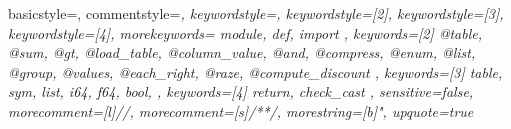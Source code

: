 
\usepackage{listings}
\usepackage{pifont}
\usepackage{ulem}


\newcommand{\hgb}[1]{{\color{Blue}{#1}}}
\newcommand{\hgr}[1]{{\color{OrangeRed}{#1}}}
\newcommand{\hgd}[1]{{\color{Red}{#1}}}
\newcommand{\head}[2]{{\textbf{#2}, #1}}

\usepackage{textcomp} %
{ basicstyle=\footnotesize\ttfamily,
  commentstyle=\color{Grey}\rmfamily\itshape,
  keywordstyle=\color{SlightPink},
  keywordstyle=[2]\color{NiceBlue},
  keywordstyle=[3]\color{NiceRed},
  keywordstyle=[4]\color{SlightRed},
  morekeywords={
  module,
  def,
  import
  },
  keywords=[2]{
  @table,
  @sum,
  @gt,
  @load_table,
  @column_value,
  @and,
  @compress,
  @enum,
  @list,
  @group,
  @values,
  @each_right,
  @raze,
  @compute_discount
  },
  keywords=[3]{
  table,
  sym,
  list,
  i64,
  f64,
  bool,
  },
  keywords=[4]{
  return,
  check_cast
  },
  sensitive=false, %
  morecomment=[l]{//}, %
  morecomment=[s]{/*}{*/}, %
  morestring=[b]", %
  upquote=true %
}
